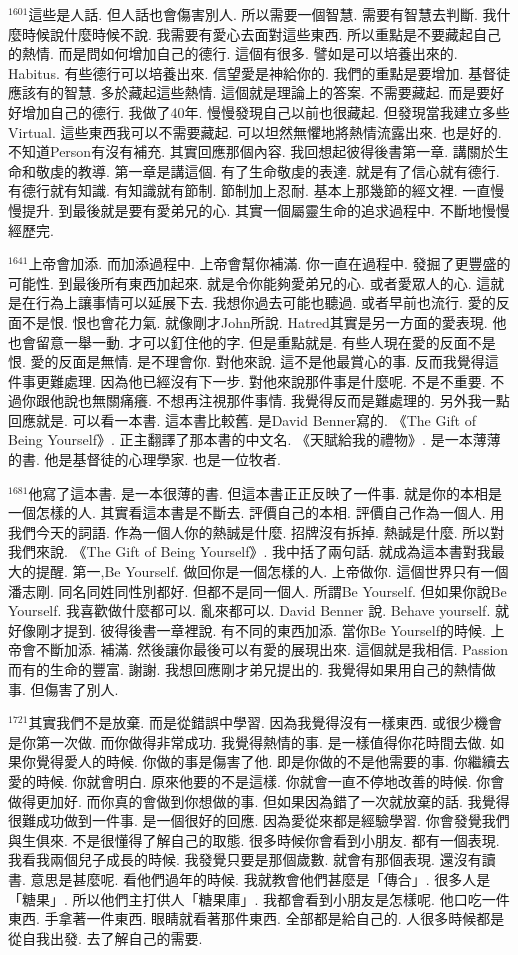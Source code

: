 \documentclass{book}
\begin{document}
$^{1601}$這些是人話.
但人話也會傷害別人.
所以需要一個智慧.
需要有智慧去判斷.
我什麼時候說什麼時候不說.
我需要有愛心去面對這些東西.
所以重點是不要藏起自己的熱情.
而是問如何增加自己的德行.
這個有很多.
譬如是可以培養出來的.
Habitus.
有些德行可以培養出來.
信望愛是神給你的.
我們的重點是要增加.
基督徒應該有的智慧.
多於藏起這些熱情.
這個就是理論上的答案.
不需要藏起.
而是要好好增加自己的德行.
我做了40年.
慢慢發現自己以前也很藏起.
但發現當我建立多些Virtual.
這些東西我可以不需要藏起.
可以坦然無懼地將熱情流露出來.
也是好的.
不知道Person有沒有補充.
其實回應那個內容.
我回想起彼得後書第一章.
講關於生命和敬虔的教導.
第一章是講這個.
有了生命敬虔的表達.
就是有了信心就有德行.
有德行就有知識.
有知識就有節制.
節制加上忍耐.
基本上那幾節的經文裡.
一直慢慢提升.
到最後就是要有愛弟兄的心.
其實一個屬靈生命的追求過程中.
不斷地慢慢經歷完.

$^{1641}$上帝會加添.
而加添過程中.
上帝會幫你補滿.
你一直在過程中.
發掘了更豐盛的可能性.
到最後所有東西加起來.
就是令你能夠愛弟兄的心.
或者愛眾人的心.
這就是在行為上讓事情可以延展下去.
我想你過去可能也聽過.
或者早前也流行.
愛的反面不是恨.
恨也會花力氣.
就像剛才John所說.
Hatred其實是另一方面的愛表現.
他也會留意一舉一動.
才可以釘住他的字.
但是重點就是.
有些人現在愛的反面不是恨.
愛的反面是無情.
是不理會你.
對他來說.
這不是他最賞心的事.
反而我覺得這件事更難處理.
因為他已經沒有下一步.
對他來說那件事是什麼呢.
不是不重要.
不過你跟他說也無關痛癢.
不想再注視那件事情.
我覺得反而是難處理的.
另外我一點回應就是.
可以看一本書.
這本書比較舊.
是David Benner寫的.
《The Gift of Being Yourself》.
正主翻譯了那本書的中文名.
《天賦給我的禮物》.
是一本薄薄的書.
他是基督徒的心理學家.
也是一位牧者.

$^{1681}$他寫了這本書.
是一本很薄的書.
但這本書正正反映了一件事.
就是你的本相是一個怎樣的人.
其實看這本書是不斷去.
評價自己的本相.
評價自己作為一個人.
用我們今天的詞語.
作為一個人你的熱誠是什麼.
招牌沒有拆掉.
熱誠是什麼.
所以對我們來說.
《The Gift of Being Yourself》.
我中括了兩句話.
就成為這本書對我最大的提醒.
第一,Be Yourself.
做回你是一個怎樣的人.
上帝做你.
這個世界只有一個潘志剛.
同名同姓同性別都好.
但都不是同一個人.
所謂Be Yourself.
但如果你說Be Yourself.
我喜歡做什麼都可以.
亂來都可以.
David Benner 說.
Behave yourself.
就好像剛才提到.
彼得後書一章裡說.
有不同的東西加添.
當你Be Yourself的時候.
上帝會不斷加添.
補滿.
然後讓你最後可以有愛的展現出來.
這個就是我相信.
Passion 而有的生命的豐富.
謝謝.
我想回應剛才弟兄提出的.
我覺得如果用自己的熱情做事.
但傷害了別人.

$^{1721}$其實我們不是放棄.
而是從錯誤中學習.
因為我覺得沒有一樣東西.
或很少機會是你第一次做.
而你做得非常成功.
我覺得熱情的事.
是一樣值得你花時間去做.
如果你覺得愛人的時候.
你做的事是傷害了他.
即是你做的不是他需要的事.
你繼續去愛的時候.
你就會明白.
原來他要的不是這樣.
你就會一直不停地改善的時候.
你會做得更加好.
而你真的會做到你想做的事.
但如果因為錯了一次就放棄的話.
我覺得很難成功做到一件事.
是一個很好的回應.
因為愛從來都是經驗學習.
你會發覺我們與生俱來.
不是很懂得了解自己的取態.
很多時候你會看到小朋友.
都有一個表現.
我看我兩個兒子成長的時候.
我發覺只要是那個歲數.
就會有那個表現.
還沒有讀書.
意思是甚麼呢.
看他們過年的時候.
我就教會他們甚麼是「傳合」.
很多人是「糖果」.
所以他們主打供人「糖果庫」.
我都會看到小朋友是怎樣呢.
他口吃一件東西.
手拿著一件東西.
眼睛就看著那件東西.
全部都是給自己的.
人很多時候都是從自我出發.
去了解自己的需要.
\end{document}
